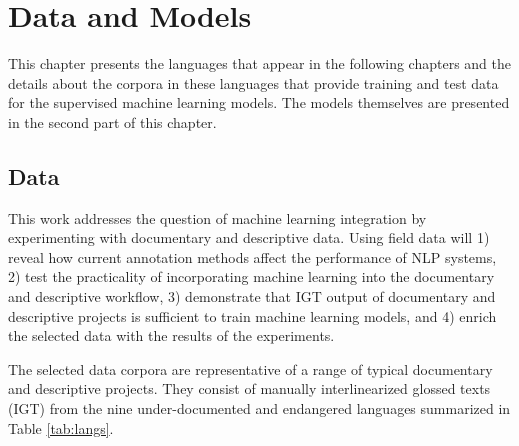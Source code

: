 \chapter{Data and Models}
\label{chap:datamodels}


This chapter presents the languages that appear in the following chapters and the details about the corpora in these languages that provide training and test data for the supervised machine learning models. The models themselves are presented in the second part of this chapter.

\section{Data}

This work addresses the question of machine learning integration by experimenting with documentary and descriptive data. Using field data will 1) reveal how current annotation methods affect the performance of NLP systems, 2) test the practicality of incorporating machine learning into the documentary and descriptive workflow, 3) demonstrate that IGT output of documentary and descriptive projects is sufficient to train machine learning models, and 4) enrich the selected data with the results of the experiments.

The selected data corpora are representative of a range of typical documentary and descriptive projects. They consist of manually interlinearized glossed texts (IGT) from the nine under-documented and endangered languages summarized in Table \ref{tab:langs}.   

